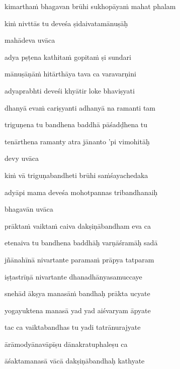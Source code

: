 kimartha\.m bhagavan brūhi sukhopāya\.m mahat phalam\thinspace{\dandab} \dontdisplaylinenum

ki\.m nivttās tu deveśa ṣidaivatamānuṣāḥ \veg\dontdisplaylinenum

mahādeva uvāca~{\dandab}\dontdisplaylinenum 

adya pṣṭena kathita\.m gopita\.m ṣi sundari\thinspace{\danda} \dontdisplaylinenum

mānuṣāṇā\.m hitārthāya tava ca varavarṇini \veg\dontdisplaylinenum

adyaprabhti deveśi khyātir loke bhaviṣyati\thinspace{\dandab} \dontdisplaylinenum

dhanyā eva\.m cariṣyanti adhanyā na ramanti tam \veg\dontdisplaylinenum

triguṇena tu bandhena baddhā pāśadḍhena tu\thinspace{\dandab} \dontdisplaylinenum

tenārthena ramanty atra jānanto 'pi vimohitāḥ \veg\dontdisplaylinenum

devy uvāca~{\dandab}\dontdisplaylinenum 

ki\.m vā triguṇabandheti brūhi sa\.mśayachedaka\thinspace{\danda} \dontdisplaylinenum

adyāpi mama deveśa mohotpannas tribandhanaiḥ \veg\dontdisplaylinenum

bhagavān uvāca~{\dandab}\dontdisplaylinenum 

prākta\.m vaikta\.m caiva dakṣiṇābandham eva ca\thinspace{\danda} \dontdisplaylinenum

etenaiva tu bandhena baddhāḥ varṇāśramāḥ sadā \veg\dontdisplaylinenum

jñānahīnā nivartante parama\.m prāpya tatparam\thinspace{\dandab} \dontdisplaylinenum

iṣṭastrīṇā nivartante dhanadhānyasamuccaye \danda\dontdisplaylinenum

snehād ākṣya manasā\.m bandhaḥ prākta ucyate \veg\dontdisplaylinenum

yogayuktena manasā yad yad aiśvaryam āpyate\thinspace{\dandab} \dontdisplaylinenum

tac ca vaiktabandhas tu yadi tatrānurajyate \veg\dontdisplaylinenum

ārāmodyānavāpīṣu dānakratuphaleṣu ca\thinspace{\dandab} \dontdisplaylinenum

āśaktamanasā vācā dakṣiṇābandhaḥ kathyate \veg\dontdisplaylinenum

